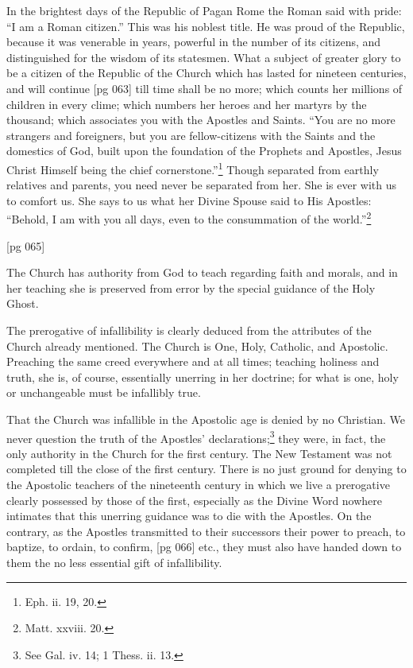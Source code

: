 In the brightest days of the Republic of Pagan
Rome the Roman said with pride: “I am a
Roman citizen.” This was his noblest title. He
was proud of the Republic, because it was venerable
in years, powerful in the number of its citizens,
and distinguished for the wisdom of its
statesmen. What a subject of greater glory to be
a citizen of the Republic of the Church which has
lasted for nineteen centuries, and will continue
[pg 063]
till time shall be no more; which counts her millions
of children in every clime; which numbers
her heroes and her martyrs by the thousand;
which associates you with the Apostles and
Saints. “You are no more strangers and foreigners,
but you are fellow-citizens with the Saints
and the domestics of God, built upon the foundation
of the Prophets and Apostles, Jesus Christ
Himself being the chief cornerstone.”\footnote{Eph. ii. 19, 20.}
Though separated from earthly relatives and parents,
you need never be separated from her. She is
ever with us to comfort us. She says to us what
her Divine Spouse said to His Apostles: “Behold,
I am with you all days, even to the consummation
of the world.”\footnote{Matt. xxviii. 20.}

[pg 065]


The Church has authority from God to teach
regarding faith and morals, and in her teaching
she is preserved from error by the special
guidance of the Holy Ghost.

The prerogative of infallibility is clearly deduced
from the attributes of the Church already
mentioned. The Church is One, Holy, Catholic,
and Apostolic. Preaching the same creed everywhere
and at all times; teaching holiness and
truth, she is, of course, essentially unerring in
her doctrine; for what is one, holy or unchangeable
must be infallibly true.

That the Church was infallible in the Apostolic
age is denied by no Christian. We never question
the truth of the Apostles' declarations;\footnote{See Gal.
iv. 14; 1 Thess. ii. 13.} they
were, in fact, the only authority in the Church
for the first century. The New Testament was
not completed till the close of the first century.
There is no just ground for denying to the Apostolic
teachers of the nineteenth century in which
we live a prerogative clearly possessed by those
of the first, especially as the Divine Word nowhere
intimates that this unerring guidance was
to die with the Apostles. On the contrary, as
the Apostles transmitted to their successors their
power to preach, to baptize, to ordain, to confirm,
[pg 066]
etc., they must also have handed down to them
the no less essential gift of infallibility.

